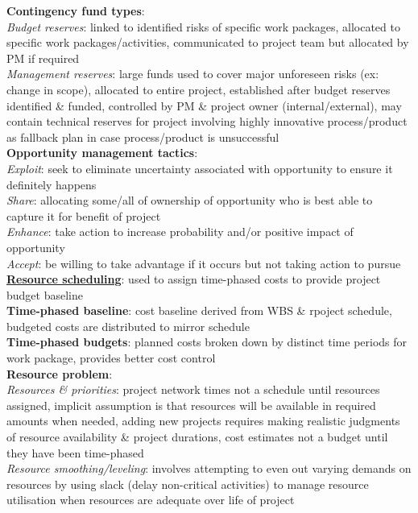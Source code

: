 \documentclass[a4paper]{article}
\begin{document}
\begin{multicols}{3}
        \textbf{Contingency fund types}:\\
        \textit{Budget reserves}: linked to identified risks of specific work packages, allocated to specific work packages/activities, communicated to project team but allocated by PM if required\\
        \textit{Management reserves}: large funds used to cover major unforeseen risks (ex: change in scope), allocated to entire project, established after budget reserves identified \& funded, controlled by PM \& project owner (internal/external), may contain technical reserves for project involving highly innovative process/product as fallback plan in case process/product is unsuccessful\\
        \textbf{Opportunity management tactics}:\\
        \textit{Exploit}: seek to eliminate uncertainty associated with opportunity to ensure it definitely happens\\
        \textit{Share}: allocating some/all of ownership of opportunity who is best able to capture it for benefit of project\\
        \textit{Enhance}: take action to increase probability and/or positive impact of opportunity\\
        \textit{Accept}: be willing to take advantage if it occurs but not taking action to pursue\\
        \underline{\textbf{Resource scheduling}}: used to assign time-phased costs to provide project budget baseline\\
        \textbf{Time-phased baseline}: cost baseline derived from WBS \& rpoject schedule, budgeted costs are distributed to mirror schedule\\
        \textbf{Time-phased budgets}: planned costs broken down by distinct time periods for work package, provides better cost control\\
        \textbf{Resource problem}:\\
        \textit{Resources \& priorities}: project network times not a schedule until resources assigned, implicit assumption is that resources will be available in required amounts when needed, adding new projects requires making realistic judgments of resource availability \& project durations, cost estimates not a budget until they have been time-phased\\
        \textit{Resource smoothing/leveling}: involves attempting to even out varying demands on resources by using slack (delay non-critical activities) to manage resource utilisation when resources are adequate over life of project\\

\end{multicols}
\end{document}
